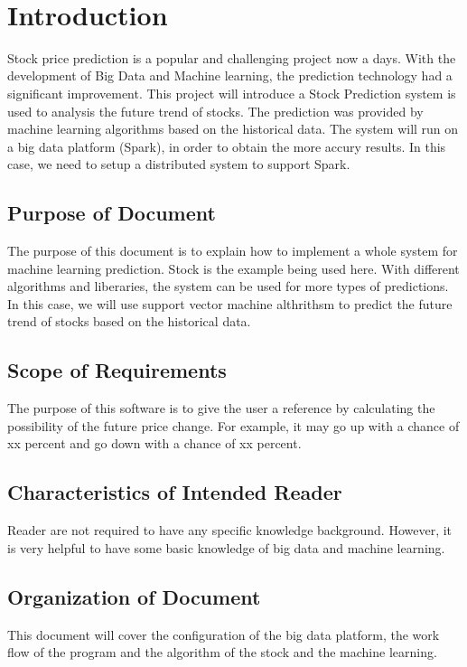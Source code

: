 \documentclass[12pt]{article}
\begin{document}
\newpage

\tableofcontents

~\newpage


\section{Introduction}
Stock price prediction is a popular and challenging project now a days. With the development of Big Data and Machine learning, the prediction technology had a significant improvement. 
This project will introduce a Stock Prediction system is used to analysis the future trend of stocks. The prediction was provided by machine learning algorithms based on the historical data. 
The system will run on a big data platform (Spark), in order to obtain the more accury results. In this case, we need to setup a distributed system to support Spark.

\subsection{Purpose of Document}
The purpose of this document is to explain how to implement a whole system for machine learning prediction. Stock is the example being used here.  With different algorithms and liberaries, the system can be used for more types of predictions.
In this case, we will use support vector machine althrithsm to predict the future trend of stocks based on the historical data. 
\subsection{Scope of Requirements} 
The purpose of this software is to give the user a reference by calculating the possibility of the future price change. For example, it may go up with a chance of xx percent and go down with a chance of xx percent. 
\subsection{Characteristics of Intended Reader} 
Reader are not required to have any specific knowledge background. However, it is very helpful to have some basic knowledge of big data and machine learning.
\subsection{Organization of Document}
This document will cover the configuration of the big data platform, the work flow of the program and the algorithm of the stock and the machine learning.
\end{document}
